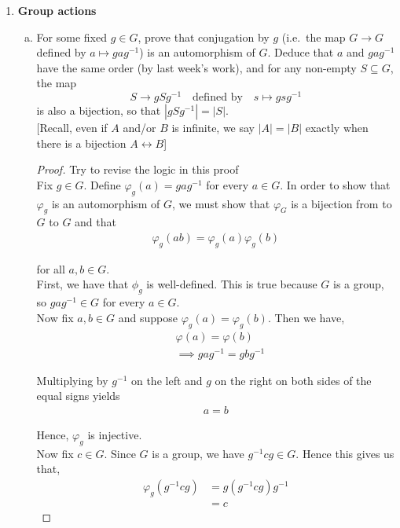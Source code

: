 \documentclass[11pt, reqno]{amsart}
\theoremstyle{plain}
\theoremstyle{definition}
\theoremstyle{example}
\newcommand{\NOTE}[1]{{\color{red}#1}}
\begin{document}
\begin{enumerate}[1.]
\item {\bf Group actions}

\begin{enumerate}[(a)] 
\item For some fixed $g \in G$, prove that conjugation by $g$ (i.e.\ the map $G \to G$ defined by $a \mapsto gag^{-1}$) is an automorphism of $G$. Deduce that $a$ and $gag^{-1}$ have the same order (by last week's work), and for any non-empty $S \subseteq G$, the map 
$$S \to gSg^{-1} \quad \text{defined by} \quad s \mapsto gsg^{-1}$$
is also a bijection, so that $|gSg^{-1}| = |S|$. \\
{\small[Recall, even if $A$ and/or $B$ is infinite, we say $|A| = |B|$ exactly when there is a bijection  $A \leftrightarrow B$]}

\begin{proof}
\NOTE{Try to revise the logic in this proof}\\
Fix $g \in G$. Define $\varphi_g(a) = gag^{-1}$ for every $a \in G$. In order to show that $\varphi_g$ is an automorphism of $G$, we must show that $\varphi_G$ is a bijection from to $G$ to $G$ and that
\begin{align*}
\varphi_g(ab) = \varphi_g(a)\varphi_g(b)
\end{align*}

for all $a, b \in G$.\\

First, we have that $\phi_g$ is well-defined. This is true because $G$ is a group, so $gag^{-1} \in G$ for every $a \in G$.\\

Now fix $a, b \in G$ and suppose $\varphi_g(a) = \varphi_g(b)$. Then we have,
\begin{align*}
&\varphi(a) = \varphi(b)\\
&\implies gag^{-1} = gbg^{-1}
\end{align*}

Multiplying by $g^{-1}$ on the left and $g$ on the right on both sides of the equal signs yields
\begin{align*}
a = b
\end{align*}

Hence, $\varphi_g$ is injective.\\

Now fix $c \in G$. Since $G$ is a group, we have $g^{-1}cg \in G$. Hence this gives us that,
\begin{align*}
\varphi_g(g^{-1}cg) &= g(g^{-1}cg)g^{-1}\\
&= c
\end{align*}


\end{proof}
\end{enumerate}
\end{enumerate}
\end{document}

